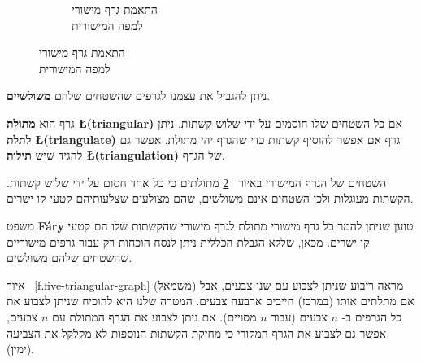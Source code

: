\begin{figure}[tb]
\begin{center}
\begin{subfigure}{.4\textwidth}
\caption{התאמת גרף מישורי\\
למפה המישורית}
\label{f.five-planar-graph-graph}
\end{subfigure}
\end{center}
\end{figure}

ניתן להגביל את עצמנו לגרפים שהשטחים שלהם
\textbf{משולשיים}.

\begin{definition}
גרף הוא
\textbf{מתולת
\L{(triangular)}}
אם כל השטחים שלו חוסמים על ידי שלוש קשתות. ניתן 
\textbf{לתלת
\L{(triangulate)}}
גרף אם אפשר להוסיף קשתות כדי שהגרף יהי מתולת. אפשר גם להגיד שיש
\textbf{תילות
\L{(triangulation)}}
של הגרף.
\end{definition}
\begin{example}
השטחים של הגרף המישורי באיור%
~\ref{f.five-planar-graph-graph}
מתולתים כי כל אחד חסום על ידי שלוש קשתות. הקשתות מעוגלות ולכן השטחים אינם משולשים, שהם מצולעים שצלעותיהם קטעי קו ישרים.
\end{example}
\begin{advanced}
משפט
\textbf{F\'{a}ry}
טוען שניתן להמר כל גרף מישורי מתולת לגרף מישורי שהקשתות שלו הם קטעי קו ישרים. מכאן, שללא הגבלת הכללית ניתן לנסח הוכחות רק עבור גרפים מישוריים שהשטחים שלהם משולשים.
\end{advanced}
\begin{example}
איור%
~\ref{f.five-triangular-graph}
(משמאל) מראה ריבוע שניתן לצבוע עם שני צבעים, אבל אם מתלתים אותו (במרכז) חייבים ארבעה צבעים. המטרה שלנו היא להוכיח שניתן לצבוע את כל הגרפים ב-%
$n$
צבעים (עבור
$n$
מסויים). אם ניתן לצבוע את הגרף המתולת עם 
$n$
צבעים, אפשר גם לצבוע את הגרף המקורי כי מחיקת הקשתות הנוספות לא מקלקל את הצביעה (ימין).
\end{example}

